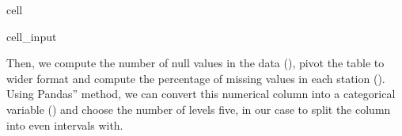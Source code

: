 \documentclass[letterpaper,10pt,english]{jupyterBook}
\begin{document}
\begin{sphinxuseclass}{cell}
\begin{sphinxuseclass}{cell_input}
\begin{sphinxVerbatim}[commandchars=\\\{\}]
   
      
      

  
\end{sphinxVerbatim}

\end{sphinxuseclass}
\end{sphinxuseclass}
\sphinxAtStartPar
Then, we compute the number of null values in the data (), pivot the table to wider format and compute the percentage of missing values in each station (). Using Pandas” method, we can convert this numerical column into a categorical variable () and choose the number of levels \sphinxhyphen{} five, in our case \sphinxhyphen{} to split the column into even intervals with.
\end{document}
